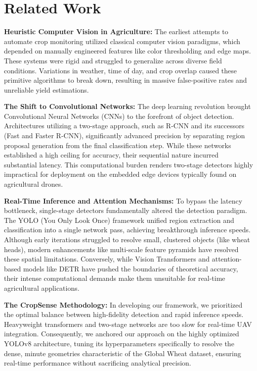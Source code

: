 \section{Related Work}
\label{sec:related}

\textbf{Heuristic Computer Vision in Agriculture:} The earliest attempts to automate crop monitoring utilized classical computer vision paradigms, which depended on manually engineered features like color thresholding and edge maps. These systems were rigid and struggled to generalize across diverse field conditions. Variations in weather, time of day, and crop overlap caused these primitive algorithms to break down, resulting in massive false-positive rates and unreliable yield estimations.

\textbf{The Shift to Convolutional Networks:} The deep learning revolution brought Convolutional Neural Networks (CNNs) to the forefront of object detection. Architectures utilizing a two-stage approach, such as R-CNN \cite{girshick2014rich} and its successors (Fast and Faster R-CNN), significantly advanced precision by separating region proposal generation from the final classification step. While these networks established a high ceiling for accuracy, their sequential nature incurred substantial latency. This computational burden renders two-stage detectors highly impractical for deployment on the embedded edge devices typically found on agricultural drones.

\textbf{Real-Time Inference and Attention Mechanisms:} To bypass the latency bottleneck, single-stage detectors fundamentally altered the detection paradigm. The YOLO (You Only Look Once) framework \cite{redmon2016you} unified region extraction and classification into a single network pass, achieving breakthrough inference speeds. Although early iterations struggled to resolve small, clustered objects (like wheat heads), modern enhancements like multi-scale feature pyramids have resolved these spatial limitations. Conversely, while Vision Transformers \cite{vaswani2017attention} and attention-based models like DETR \cite{carion2020end} have pushed the boundaries of theoretical accuracy, their intense computational demands make them unsuitable for real-time agricultural applications.

\textbf{The CropSense Methodology:} In developing our framework, we prioritized the optimal balance between high-fidelity detection and rapid inference speeds. Heavyweight transformers and two-stage networks are too slow for real-time UAV integration. Consequently, we anchored our approach on the highly optimized YOLOv8 architecture, tuning its hyperparameters specifically to resolve the dense, minute geometries characteristic of the Global Wheat dataset, ensuring real-time performance without sacrificing analytical precision.
